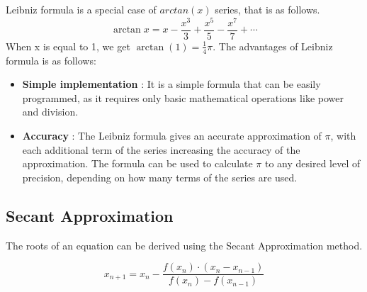     \begin{flushleft}
      Leibniz formula is a special case of $arctan(x)$ series, that is as follows.
      $$\arctan x=x-{\frac {x^{3}}{3}}+{\frac {x^{5}}{5}}-{\frac {x^{7}}{7}}+\cdots$$
      When x is equal to 1, we get $\arctan(1) = {\frac{1}{4}}\pi.$
      The advantages of Leibniz formula is as follows:
      \begin{itemize}
        \item \textbf{Simple implementation} : It is a simple formula that can be easily programmed, as it requires only basic mathematical operations like power and division.
        \item \textbf{Accuracy} : The Leibniz formula gives an accurate approximation of $\pi$, with each additional term of the series increasing the accuracy of the approximation. The formula can be used to calculate $\pi$ to any desired level of precision, depending on how many terms of the series are used.
      \end{itemize}
    \end{flushleft}

  \subsection{Secant Approximation}
    \begin{flushleft}
    The roots of an equation can be derived using the Secant Approximation method.
    \end{flushleft}
    $$ x_{n+1} = x_n - \frac{f(x_n) \cdot (x_n - x_{n-1})}{f(x_n) - f(x_{n-1})} $$

